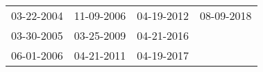 \begin{supertabular}{llll}
 03-22-2004 &  11-09-2006 &  04-19-2012 &  08-09-2018 \\
 03-30-2005 &  03-25-2009 &  04-21-2016 &             \\
 06-01-2006 &  04-21-2011 &  04-19-2017 &             \\
\end{supertabular}
